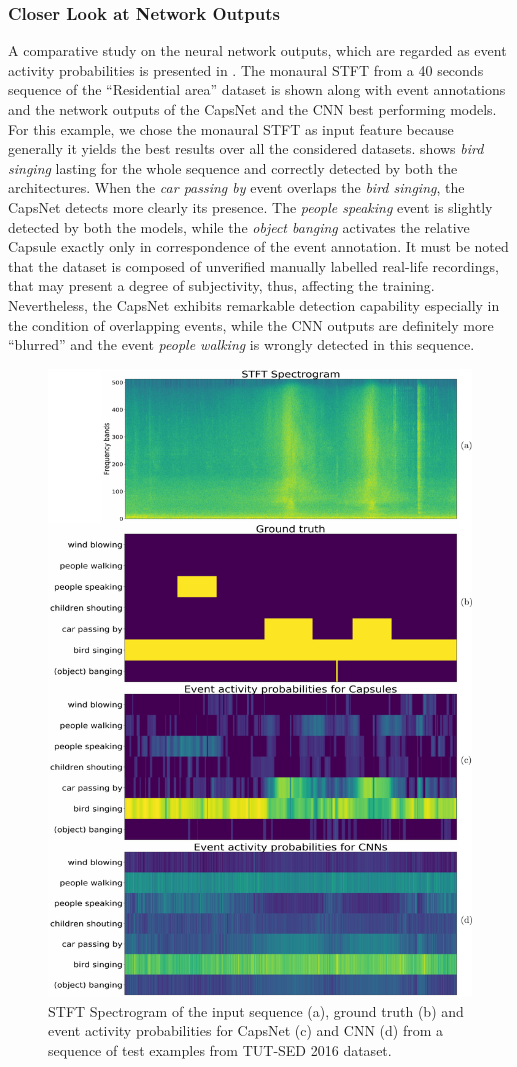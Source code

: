 \subsubsection{Closer Look at Network Outputs}
A comparative study on the neural network outputs, which are regarded as event activity probabilities is presented in . The monaural STFT from a 40 seconds sequence of the ``Residential area'' dataset is shown along with event annotations and the network outputs of the CapsNet and the CNN best performing models. For this example, we chose the monaural STFT as input feature because generally it yields the best results over all the considered datasets.  shows \textit{bird singing} lasting for the whole sequence and correctly detected by both the architectures. When the \textit{car passing by} event overlaps the \textit{bird singing}, the CapsNet detects more clearly its presence. The \textit{people speaking} event is slightly detected by both the models, while the \textit{object banging} activates the relative Capsule exactly only in correspondence of the event annotation. It must be noted that the dataset is composed of unverified manually labelled real-life recordings, that may present a degree of subjectivity, thus, affecting the training. Nevertheless, the CapsNet exhibits remarkable detection capability especially in the condition of overlapping events, while the CNN outputs are definitely more ``blurred'' and the event \textit{people walking} is wrongly detected in this sequence. 

\begin{figure}[h!]
	\centering
	\includegraphics[width=0.5\columnwidth]{img/activations}
	\caption{STFT Spectrogram of the input sequence (a), ground truth (b) and event activity probabilities for CapsNet (c) and CNN (d) from a sequence of test examples from TUT-SED 2016 dataset.}
	\label{fig:activations}
\end{figure}



